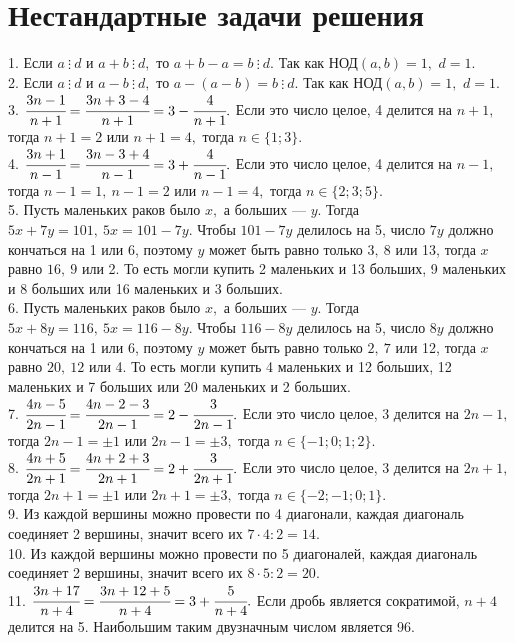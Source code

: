 \section{Нестандартные задачи решения}
1. Если $a\ \vdots\ d$ и $a+b\ \vdots\ d,$ то $a+b-a=b\ \vdots\ d.$ Так как НОД$(a, b)=1,$ $d=1.$\\
2. Если $a\ \vdots\ d$ и $a-b\ \vdots\ d,$ то $a-(a-b)=b\ \vdots\ d.$ Так как НОД$(a, b)=1,$ $d=1.$\\
3. $\cfrac{3n-1}{n+1}=\cfrac{3n+3-4}{n+1}=3-\cfrac{4}{n+1}.$ Если это число целое, 4 делится на $n+1,$ тогда $n+1=2$ или $n+1=4,$
тогда $n\in\{1; 3\}.$\\
4. $\cfrac{3n+1}{n-1}=\cfrac{3n-3+4}{n-1}=3+\cfrac{4}{n-1}.$ Если это число целое, 4 делится на $n-1,$ тогда $n-1=1,\ n-1=2$ или $n-1=4,$
тогда $n\in\{2; 3; 5\}.$\\
5. Пусть маленьких раков было $x,$ а больших --- $y.$ Тогда  $5x+7y=101,\ 5x=101-7y.$ Чтобы $101-7y$ делилось на 5, число $7y$ должно кончаться на 1 или 6, поэтому $y$ может быть равно только $3,\ 8$ или 13, тогда $x$ равно $16,\ 9$ или 2. То есть могли купить 2 маленьких и 13 больших, 9 маленьких и 8 больших или 16 маленьких и 3 больших.\\
6. Пусть маленьких раков было $x,$ а больших --- $y.$ Тогда  $5x+8y=116,\ 5x=116-8y.$ Чтобы $116-8y$ делилось на 5, число $8y$ должно кончаться на 1 или 6, поэтому $y$ может быть равно только $2,\ 7$ или 12, тогда $x$ равно $20,\ 12$ или 4. То есть могли купить 4 маленьких и 12 больших, 12 маленьких и 7 больших или 20 маленьких и 2 больших.\\
7. $\cfrac{4n-5}{2n-1}=\cfrac{4n-2-3}{2n-1}=2-\cfrac{3}{2n-1}.$ Если это число целое, 3 делится на $2n-1,$ тогда $2n-1=\pm1$ или $2n-1=\pm3,$ тогда
$n\in\{-1; 0; 1; 2\}.$\\
8. $\cfrac{4n+5}{2n+1}=\cfrac{4n+2+3}{2n+1}=2+\cfrac{3}{2n+1}.$ Если это число целое, 3 делится на $2n+1,$ тогда $2n+1=\pm1$ или $2n+1=\pm3,$ тогда
$n\in\{-2; -1; 0; 1\}.$\\
9. Из каждой вершины можно провести по 4 диагонали, каждая диагональ соединяет 2 вершины, значит всего их $7\cdot4:2=14.$\\
10. Из каждой вершины можно провести по 5 диагоналей, каждая диагональ соединяет 2 вершины, значит всего их $8\cdot5:2=20.$\\
11. $\cfrac{3n+17}{n+4}=\cfrac{3n+12+5}{n+4}=3+\cfrac{5}{n+4}.$ Если дробь является сократимой, $n+4$ делится на 5. Наибольшим таким двузначным числом является 96.\\
